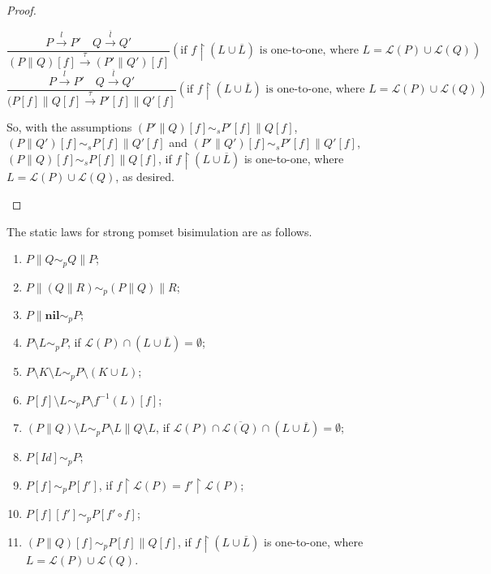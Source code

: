 \begin{proof}
\begin{enumerate}
      $$\frac{P\xrightarrow{l}P'\quad Q\xrightarrow{\overline{l}}Q'}{(P\parallel Q)[f]\xrightarrow{\tau}(P'\parallel Q')[f]}(\textrm{if } f\upharpoonright(L\cup\overline{L}) \textrm{ is one-to-one, where }L=\mathcal{L}(P)\cup\mathcal{L}(Q))$$
      $$\frac{P\xrightarrow{l}P'\quad Q\xrightarrow{\overline{l}}Q'}{(P[f]\parallel Q[f]\xrightarrow{\tau}P'[f]\parallel Q'[f]}(\textrm{if } f\upharpoonright(L\cup\overline{L}) \textrm{ is one-to-one, where }L=\mathcal{L}(P)\cup\mathcal{L}(Q))$$

      So, with the assumptions $(P'\parallel Q)[f]\sim_s P'[f]\parallel Q[f]$, $(P\parallel Q')[f]\sim_s P[f]\parallel Q'[f]$ and $(P'\parallel Q')[f]\sim_s P'[f]\parallel Q'[f]$, $(P\parallel Q)[f]\sim_s P[f]\parallel Q[f]$, if $f\upharpoonright(L\cup\overline{L})$ is one-to-one, where $L=\mathcal{L}(P)\cup\mathcal{L}(Q)$, as desired.
\end{enumerate}
\end{proof}

\begin{proposition} \label{SLSPB}
The static laws for strong pomset bisimulation are as follows.
\begin{enumerate}
  \item $P\parallel Q\sim_p Q\parallel P$;
  \item $P\parallel(Q\parallel R)\sim_p (P\parallel Q)\parallel R$;
  \item $P\parallel \textbf{nil}\sim_p P$;
  \item $P\setminus L\sim_p P$, if $\mathcal{L}(P)\cap(L\cup\overline{L})=\emptyset$;
  \item $P\setminus K\setminus L\sim_p P\setminus(K\cup L)$;
  \item $P[f]\setminus L\sim_p P\setminus f^{-1}(L)[f]$;
  \item $(P\parallel Q)\setminus L\sim_p P\setminus L\parallel Q\setminus L$, if $\mathcal{L}(P)\cap\overline{\mathcal{L}(Q)}\cap(L\cup\overline{L})=\emptyset$;
  \item $P[Id]\sim_p P$;
  \item $P[f]\sim_p P[f']$, if $f\upharpoonright\mathcal{L}(P)=f'\upharpoonright\mathcal{L}(P)$;
  \item $P[f][f']\sim_p P[f'\circ f]$;
  \item $(P\parallel Q)[f]\sim_p P[f]\parallel Q[f]$, if $f\upharpoonright(L\cup\overline{L})$ is one-to-one, where $L=\mathcal{L}(P)\cup\mathcal{L}(Q)$.
\end{enumerate}
\end{proposition}

